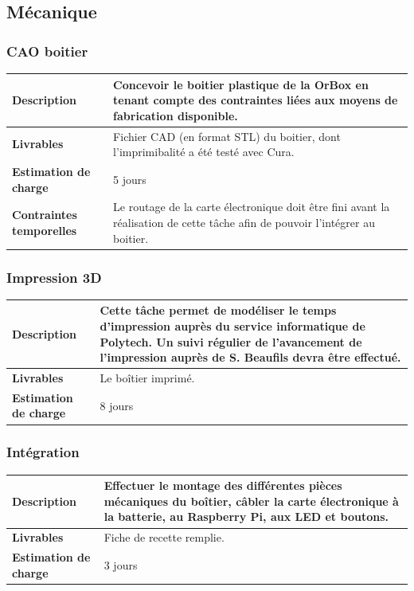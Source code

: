 
\subsection{Mécanique}

\subsubsection{CAO boitier}

\begin{tabularx}{13cm}{lX}
    \toprule
        \textbf{Description} &
        Concevoir le boitier plastique de la OrBox en tenant compte des contraintes liées aux moyens de fabrication disponible. \\
    \midrule
        \textbf{Livrables} &
        Fichier CAD (en format STL) du boitier, dont l'imprimibalité a été testé avec Cura. \\
    \midrule
        \textbf{Estimation de charge} &
        5 jours \\
    \midrule
        \textbf{Contraintes temporelles} &
        Le routage de la carte électronique doit être fini avant la réalisation de cette tâche afin de pouvoir l'intégrer au boitier. \\
    \bottomrule
\end{tabularx}

\subsubsection{Impression 3D}

\begin{tabularx}{13cm}{lX}
    \toprule
        \textbf{Description} &
        Cette tâche permet de modéliser le temps d'impression auprès du service informatique de Polytech.
        Un suivi régulier de l'avancement de l'impression auprès de S. Beaufils devra être effectué.\\
    \midrule
        \textbf{Livrables} &
        Le boîtier imprimé. \\
    \midrule
        \textbf{Estimation de charge} &
        8 jours \\
    \bottomrule
\end{tabularx}

\subsubsection{Intégration}

\begin{tabularx}{13cm}{lX}
    \toprule
        \textbf{Description} &
        Effectuer le montage des différentes pièces mécaniques du boîtier, câbler la carte électronique à la batterie, au Raspberry Pi, aux LED et boutons. \\
    \midrule
        \textbf{Livrables} &
        Fiche de recette remplie. \\
    \midrule
        \textbf{Estimation de charge} &
        3 jours \\
    \bottomrule
\end{tabularx}


